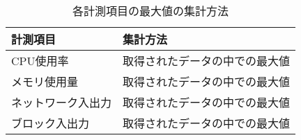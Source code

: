 \documentclass[../../../../main]{subfiles}
\begin{document}
    \begin{table}[htbp]
        \centering
        \caption{各計測項目の最大値の集計方法}
        \label{tab:max-aggregation-method}
        \begin{tabular}{|l|l|}
            \hline
            \textbf{計測項目} & \textbf{集計方法}   \\ \hline
            CPU使用率        & 取得されたデータの中での最大値 \\ \hline
            メモリ使用量        & 取得されたデータの中での最大値 \\ \hline
            ネットワーク入出力     & 取得されたデータの中での最大値 \\ \hline
            ブロック入出力       & 取得されたデータの中での最大値 \\ \hline
        \end{tabular}
    \end{table}
\end{document}
